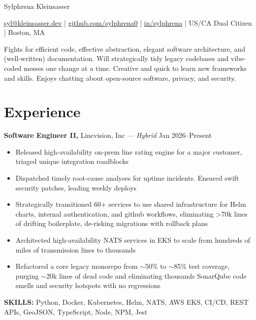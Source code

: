 \documentclass[11pt]{article}       %
\begin{document}
\centerline{\Huge Sylphrena Kleinsasser}

\vspace{5pt}

\centerline{\href{mailto:syl@kleinsasser.dev}{syl@kleinsasser.dev} | \href{https://github.com/sylphrena0}{github.com/sylphrena0} | \href{https://www.linkedin.com/in/sylphrena/}{in/sylphrena} | US/CA Dual Citizen | Boston, MA}
\vspace{4pt}

Fights for efficient code, effective abstraction, elegant software architecture, and (well-written) documentation. Will strategically tidy legacy codebases and vibe-coded messes one change at a time. Creative and quick to learn new frameworks and skills. Enjoys chatting about open-source software, privacy, and security.

\vspace{-6.5pt}

\section*{Experience}
\textbf{Software Engineer II,} {Linevision, Inc} --- \textit{Hybrid} \hfill Jan 2026--Present \\
\vspace{-9pt}
\begin{itemize}[leftmargin=0.35in]
  \item Released high-availability on-prem line rating engine for a major customer, triaged unique integration roadblocks
  \item Dispatched timely root-cause analyses for uptime incidents. Ensured swift security patches, leading weekly deploys
  \item Strategically transitioned 60+ services to use shared infrastructure for Helm charts, internal authentication, and github workflows, eliminating >70k lines of drifting boilerplate, de-risking migrations with rollback plans
  \item Architected high-availability NATS services in EKS to scale from hundreds of miles of transmission lines to thousands 
  \item Refactored a core legacy monorepo from $\sim$50\% to $\sim$85\% test coverage, purging $\sim$20k lines of dead code and eliminating thousands SonarQube code smells and security hotspots with no regressions

\end{itemize}
\vspace{-9pt}
\textbf{SKILLS:} Python, Docker, Kubernetes, Helm, NATS, AWS EKS, CI/CD, REST APIs, GeoJSON, TypeScript, Node, NPM, Jest
\vspace{9pt}
\end{document}
